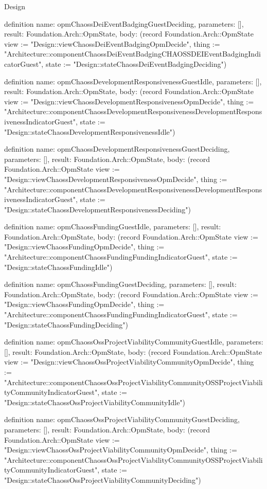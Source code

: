 \begin{lexlean}{Design}
\begin{semanticmodule}
definition{
  name: opmChaossDeiEventBadgingGuestDeciding,
  parameters: [],
  result: Foundation.Arch::OpmState,
  body: (record Foundation.Arch::OpmState {view := "Design::viewChaossDeiEventBadgingOpmDecide", thing := "Architecture::componentChaossDeiEventBadgingCHAOSSDEIEventBadgingIndicatorGuest", state := "Design::stateChaossDeiEventBadgingDeciding"})
}

definition{
  name: opmChaossDevelopmentResponsivenessGuestIdle,
  parameters: [],
  result: Foundation.Arch::OpmState,
  body: (record Foundation.Arch::OpmState {view := "Design::viewChaossDevelopmentResponsivenessOpmDecide", thing := "Architecture::componentChaossDevelopmentResponsivenessDevelopmentResponsivenessIndicatorGuest", state := "Design::stateChaossDevelopmentResponsivenessIdle"})
}

definition{
  name: opmChaossDevelopmentResponsivenessGuestDeciding,
  parameters: [],
  result: Foundation.Arch::OpmState,
  body: (record Foundation.Arch::OpmState {view := "Design::viewChaossDevelopmentResponsivenessOpmDecide", thing := "Architecture::componentChaossDevelopmentResponsivenessDevelopmentResponsivenessIndicatorGuest", state := "Design::stateChaossDevelopmentResponsivenessDeciding"})
}

definition{
  name: opmChaossFundingGuestIdle,
  parameters: [],
  result: Foundation.Arch::OpmState,
  body: (record Foundation.Arch::OpmState {view := "Design::viewChaossFundingOpmDecide", thing := "Architecture::componentChaossFundingFundingIndicatorGuest", state := "Design::stateChaossFundingIdle"})
}

definition{
  name: opmChaossFundingGuestDeciding,
  parameters: [],
  result: Foundation.Arch::OpmState,
  body: (record Foundation.Arch::OpmState {view := "Design::viewChaossFundingOpmDecide", thing := "Architecture::componentChaossFundingFundingIndicatorGuest", state := "Design::stateChaossFundingDeciding"})
}

definition{
  name: opmChaossOssProjectViabilityCommunityGuestIdle,
  parameters: [],
  result: Foundation.Arch::OpmState,
  body: (record Foundation.Arch::OpmState {view := "Design::viewChaossOssProjectViabilityCommunityOpmDecide", thing := "Architecture::componentChaossOssProjectViabilityCommunityOSSProjectViabilityCommunityIndicatorGuest", state := "Design::stateChaossOssProjectViabilityCommunityIdle"})
}

definition{
  name: opmChaossOssProjectViabilityCommunityGuestDeciding,
  parameters: [],
  result: Foundation.Arch::OpmState,
  body: (record Foundation.Arch::OpmState {view := "Design::viewChaossOssProjectViabilityCommunityOpmDecide", thing := "Architecture::componentChaossOssProjectViabilityCommunityOSSProjectViabilityCommunityIndicatorGuest", state := "Design::stateChaossOssProjectViabilityCommunityDeciding"})
}


\end{semanticmodule}
\end{lexlean}
